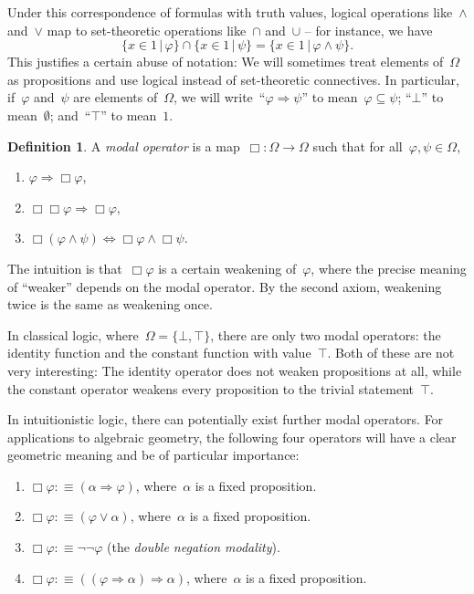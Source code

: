 \documentclass[10pt]{amsart}
\theoremstyle{definition}
\newtheorem{defn}{Definition}[section]
\theoremstyle{plain}
\theoremstyle{remark}
\newcommand{\?}{\,{:}\,}
\renewcommand{\_}{\mathpunct{.}\,}
\begin{document}
Under this correspondence of formulas with truth values, logical operations
like~$\wedge$ and~$\vee$ map to set-theoretic operations like~$\cap$ and~$\cup$
-- for instance, we have
\[ \{ x \in 1 \,|\, \varphi \} \cap \{ x \in 1 \,|\, \psi \} =
  \{ x \in 1 \,|\, \varphi \wedge \psi \}. \]
This justifies a certain abuse of notation: We will sometimes treat elements
of~$\Omega$ as propositions and use logical instead of set-theoretic
connectives. In particular, if~$\varphi$ and~$\psi$ are elements of~$\Omega$,
we will write~``$\varphi \Rightarrow \psi$'' to mean~$\varphi \subseteq \psi$;
``$\bot$'' to mean~$\emptyset$; and~``$\top$'' to mean~$1$.

\begin{defn}A \emph{modal operator} is a map~$\Box : \Omega \to \Omega$ such
that for all~$\varphi, \psi \in \Omega$,
\begin{enumerate}
\item $\varphi \Longrightarrow \Box\varphi$,
\item $\Box\Box\varphi \Longrightarrow \Box\varphi$,
\item $\Box(\varphi \wedge \psi) \Longleftrightarrow \Box\varphi \wedge \Box\psi$.
\end{enumerate}
\end{defn}

The intuition is that~$\Box\varphi$ is a certain weakening of~$\varphi$, where
the precise meaning of ``weaker'' depends on the modal operator. By the second
axiom, weakening twice is the same as weakening once.

In classical logic, where~$\Omega = \{ \bot, \top \}$, there are only two modal
operators: the identity function and the constant function with value~$\top$.
Both of these are not very interesting: The identity operator does not weaken
propositions at all, while the constant operator weakens every proposition to
the trivial statement~$\top$.

In intuitionistic logic, there can potentially exist further modal operators.
For applications to algebraic geometry, the following four operators will have
a clear geometric meaning and be of particular importance:
\begin{enumerate}
\item $\Box\varphi :\equiv (\alpha \Rightarrow \varphi)$, where~$\alpha$ is a
fixed proposition.
\item $\Box\varphi :\equiv (\varphi \vee \alpha)$, where~$\alpha$ is a
fixed proposition.
\item $\Box\varphi :\equiv \neg\neg\varphi$ (the \emph{double negation
modality}).
\item $\Box\varphi :\equiv ((\varphi \Rightarrow \alpha) \Rightarrow \alpha)$,
where~$\alpha$ is a fixed proposition.
\end{enumerate}
\end{document}
